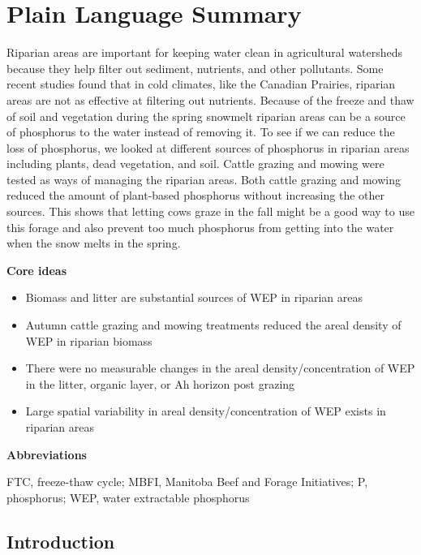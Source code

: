 \documentclass[
]{agujournal2019}
\providecommand{\tightlist}{%
  \setlength{\itemsep}{0pt}\setlength{\parskip}{0pt}}\usepackage{longtable,booktabs,array}
\begin{document}
\section*{Plain Language Summary}
Riparian areas are important for keeping water clean in agricultural
watersheds because they help filter out sediment, nutrients, and other
pollutants. Some recent studies found that in cold climates, like the
Canadian Prairies, riparian areas are not as effective at filtering out
nutrients. Because of the freeze and thaw of soil and vegetation during
the spring snowmelt riparian areas can be a source of phosphorus to the
water instead of removing it. To see if we can reduce the loss of
phosphorus, we looked at different sources of phosphorus in riparian
areas including plants, dead vegetation, and soil. Cattle grazing and
mowing were tested as ways of managing the riparian areas. Both cattle
grazing and mowing reduced the amount of plant-based phosphorus without
increasing the other sources. This shows that letting cows graze in the
fall might be a good way to use this forage and also prevent too much
phosphorus from getting into the water when the snow melts in the
spring.




\textbf{Core ideas}

\begin{itemize}
\tightlist
\item
  Biomass and litter are substantial sources of WEP in riparian areas
\item
  Autumn cattle grazing and mowing treatments reduced the areal density
  of WEP in riparian biomass
\item
  There were no measurable changes in the areal density/concentration of
  WEP in the litter, organic layer, or Ah horizon post grazing
\item
  Large spatial variability in areal density/concentration of WEP exists
  in riparian areas
\end{itemize}

\textbf{Abbreviations}

FTC, freeze-thaw cycle; MBFI, Manitoba Beef and Forage Initiatives; P,
phosphorus; WEP, water extractable phosphorus

\subsection{Introduction}\label{introduction}
\end{document}
